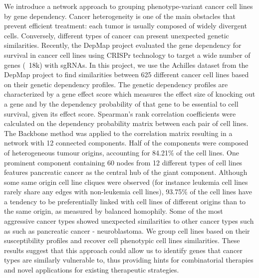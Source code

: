 \documentclass[12pt]{article}
\begin{document}
We introduce a network approach to grouping phenotype-variant cancer cell lines by gene dependency. Cancer heterogeneity is one of the main obstacles that prevent efficient treatment: each tumor is usually composed of widely divergent cells. Conversely, different types of cancer can present unexpected genetic similarities. Recently, the DepMap project \cite{Tsherniak17} evaluated the gene dependency for survival in cancer cell lines using CRISPr technology to target a wide number of genes (~18k) with sgRNAs. In this project, we use the Achilles dataset from the DepMap project to find similarities between 625 different cancer cell lines based on their genetic dependency profiles. The genetic dependency profiles are characterized by a gene effect score which measures the effect size of knocking out a gene and by the dependency probability of that gene to be essential to cell survival, given its effect score. Spearman’s rank correlation coefficients were calculated on the dependency probability matrix between each pair of cell lines. The Backbone method \cite{Serrano09} was applied to the correlation matrix resulting in a network with 12 connected components. Half of the components were composed of heterogeneous tumour origins, accounting for 84.21$\%$ of the cell lines. One prominent component containing 60 nodes from 12 different types of cell lines features pancreatic cancer as the central hub of the giant component. Although some same origin cell line cliques were observed (for instance leukemia cell lines rarely share any edges with non-leukemia cell lines), 93.75$\%$ of the cell lines have a tendency to be preferentially linked with cell lines of different origins than to the same origin, as measured by balanced homophily. Some of the most aggressive cancer types showed unexpected similarities to other cancer types such as such as pancreatic cancer - neuroblastoma. We group cell lines based on their susceptibility profiles and recover cell phenotypic cell lines similarities. These results suggest that this approach could allow us to identify genes that cancer types are similarly vulnerable to, thus providing hints for combinatorial therapies and novel applications for existing therapeutic strategies. 
\end{document}

